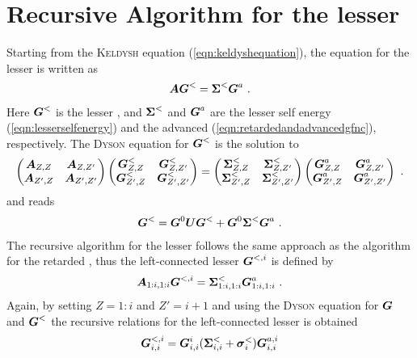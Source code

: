 \section{Recursive Algorithm for the lesser \cgfnc{}}
Starting from the \textsc{Keldysh} equation (\cref{eqn:keldyshequation}), the equation for the lesser \gfnc{} is written as
\begin{align}
\boldsymbol{A}\boldsymbol{G}^< = \boldsymbol{\Sigma}^< \boldsymbol{G}^a\ .
\end{align}
Here $\boldsymbol{G}^<$ is the lesser \gfnc{}, and $\boldsymbol{\Sigma}^<$ and $\boldsymbol{G}^a$ are the lesser self energy (\cref{eqn:lesserselfenergy}) and the advanced \gfnc{} (\cref{eqn:retardedandadvancedgfnc}), respectively. The \textsc{Dyson} equation for $\boldsymbol{G}^<$ is the solution to
\begin{align}
  \begin{pmatrix} \boldsymbol{A}_{Z,Z} & \boldsymbol{A}_{Z,Z'}\\
		  \boldsymbol{A}_{Z',Z} & \boldsymbol{A}_{Z',Z'}
  \end{pmatrix}
  \begin{pmatrix} \boldsymbol{G}^<_{Z,Z} & \boldsymbol{G}^<_{Z,Z'}\\
		  \boldsymbol{G}^<_{Z',Z} & \boldsymbol{G}^<_{Z',Z'}
  \end{pmatrix} = 
  \begin{pmatrix} \boldsymbol{\Sigma}^<_{Z,Z} & \boldsymbol{\Sigma}^<_{Z,Z'}\\
		  \boldsymbol{\Sigma}^<_{Z',Z} & \boldsymbol{\Sigma}^<_{Z',Z'}
  \end{pmatrix}
  \begin{pmatrix} \boldsymbol{G}^a_{Z,Z} & \boldsymbol{G}^a_{Z,Z'}\\
		  \boldsymbol{G}^a_{Z',Z} & \boldsymbol{G}^a_{Z',Z'}
  \end{pmatrix}\ .
\end{align}
and reads
\begin{align}
\boldsymbol{G}^< = \boldsymbol{G}^0\boldsymbol{U}\boldsymbol{G}^< + \boldsymbol{G}^0\boldsymbol{\Sigma}^<\boldsymbol{G}^a\ .
\end{align}
The recursive algorithm for the lesser \gfnc{} follows the same approach as the algorithm for the retarded \gfnc{}, thus the left-connected lesser \gfnc{} $\boldsymbol{G}^{<,i}$ is defined by
\begin{align}
\mat{A}_{1:i,1:i}\mat{G}^{<,i}=\mat{\Sigma}^<_{1:i,1:i}\mat{G}^a_{1:i,1:i}\ .
\end{align}
Again, by setting $Z=1:i$ and $Z'=i+1$ and using the \textsc{Dyson} equation for $\boldsymbol{G}$ and $\boldsymbol{G}^<$ the recursive relations for the left-connected lesser \gfnc{} is obtained
\begin{align}
\boldsymbol{G}^{<,i}_{i,i} = \boldsymbol{G}^{i}_{i,i}( \boldsymbol{\Sigma}^<_{i,i}+\boldsymbol{\sigma}^<_{i})\boldsymbol{G}^{a,i}_{i,i}
\end{align}
